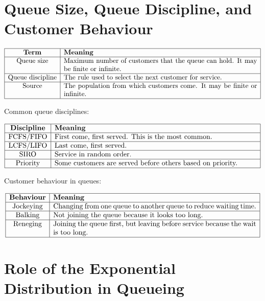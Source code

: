 \documentclass[12pt]{article}
\begin{document}
\section{Queue Size, Queue Discipline, and Customer Behaviour}

\[
\begin{array}{|c|p{10cm}|}
\hline
\textbf{Term} & \textbf{Meaning}\\
\hline
\text{Queue size} & Maximum number of customers that the queue can hold. It may be finite or infinite.\\
\hline
\text{Queue discipline} & The rule used to select the next customer for service.\\
\hline
\text{Source} & The population from which customers come. It may be finite or infinite.\\
\hline
\end{array}
\]

Common queue disciplines:

\[
\begin{array}{|c|p{10cm}|}
\hline
\textbf{Discipline} & \textbf{Meaning}\\
\hline
\text{FCFS/FIFO} & First come, first served. This is the most common.\\
\hline
\text{LCFS/LIFO} & Last come, first served.\\
\hline
\text{SIRO} & Service in random order.\\
\hline
\text{Priority} & Some customers are served before others based on priority.\\
\hline
\end{array}
\]

Customer behaviour in queues:

\[
\begin{array}{|c|p{10cm}|}
\hline
\textbf{Behaviour} & \textbf{Meaning}\\
\hline
\text{Jockeying} & Changing from one queue to another queue to reduce waiting time.\\
\hline
\text{Balking} & Not joining the queue because it looks too long.\\
\hline
\text{Reneging} & Joining the queue first, but leaving before service because the wait is too long.\\
\hline
\end{array}
\]

\section{Role of the Exponential Distribution in Queueing}
\end{document}
